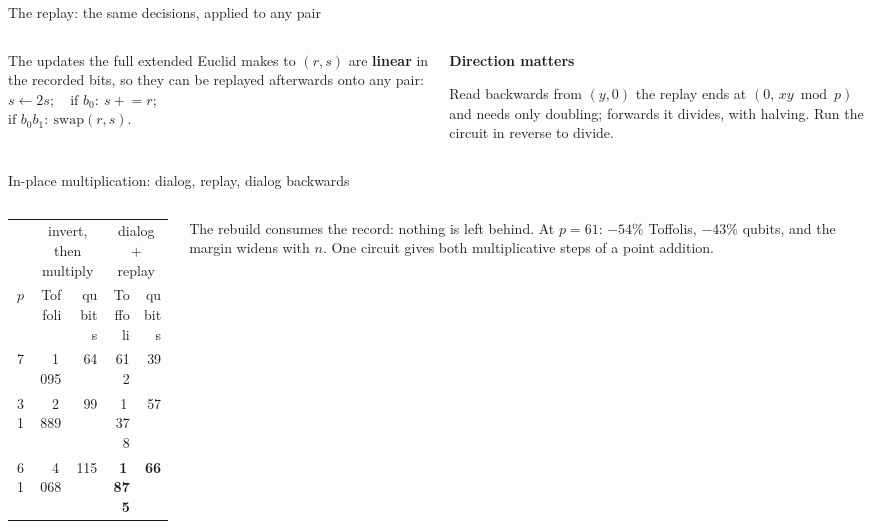 \documentclass[aspectratio=169,11pt]{beamer}
\newcommand{\peachtitle}[1]{{\bfseries\color{cverm}#1}\par\vskip1mm}
\newcommand{\code}[2][]{}
\begin{document}
\begin{frame}[fragile]{The replay: the same decisions, applied to any pair}
  \begin{columns}[T]
    \begin{column}{0.48\textwidth}
      \small The updates the full extended Euclid makes to $(r,s)$ are \textbf{linear} in the recorded bits, so they can be replayed afterwards onto any pair:
      \vskip1mm
      \centering$s\leftarrow2s;\quad \text{if } b_0:\ s\mathrel{+}=r;$\\[0.5mm]
      $\text{if } b_0b_1:\ \text{swap}(r,s).$
    \end{column}
    \begin{column}{0.48\textwidth}
      \begin{peachblock}[fontupper=\small]\peachtitle{Direction matters}
        Read backwards from $(y,0)$ the replay ends at $(0,\,xy\bmod p)$ and needs only doubling; forwards it divides, with halving. Run the circuit in reverse to divide.
      \end{peachblock}
    \end{column}
  \end{columns}
  \code[basicstyle=\ttfamily\scriptsize]{bezout_replay.py}
\end{frame}

\begin{frame}[fragile]{In-place multiplication: dialog, replay, dialog backwards}
  \code[basicstyle=\ttfamily\fontsize{7.6}{8.8}\selectfont]{inplace_mul_short.py}
  \begin{columns}[T]
    \begin{column}{0.5\textwidth}
      \centering\footnotesize
      \renewcommand{\arraystretch}{1.08}
      \begin{tabular}{@{}rrrrr@{}}
        \toprule
        & \multicolumn{2}{c}{invert, then multiply} & \multicolumn{2}{c}{dialog $+$ replay} \\
        $p$ & Toffoli & qubits & Toffoli & qubits \\
        \midrule
        7 & 1\,095 & 64 & 612 & 39 \\
        31 & 2\,889 & 99 & 1\,378 & 57 \\
        61 & 4\,068 & 115 & \textbf{1\,875} & \textbf{66} \\
        \bottomrule
      \end{tabular}
    \end{column}
    \begin{column}{0.46\textwidth}
      \small The rebuild consumes the record: nothing is left behind. At $p=61$: $-54\%$ Toffolis, $-43\%$ qubits, and the margin widens with $n$. One circuit gives both multiplicative steps of a point addition.
    \end{column}
  \end{columns}
\end{frame}
\end{document}
